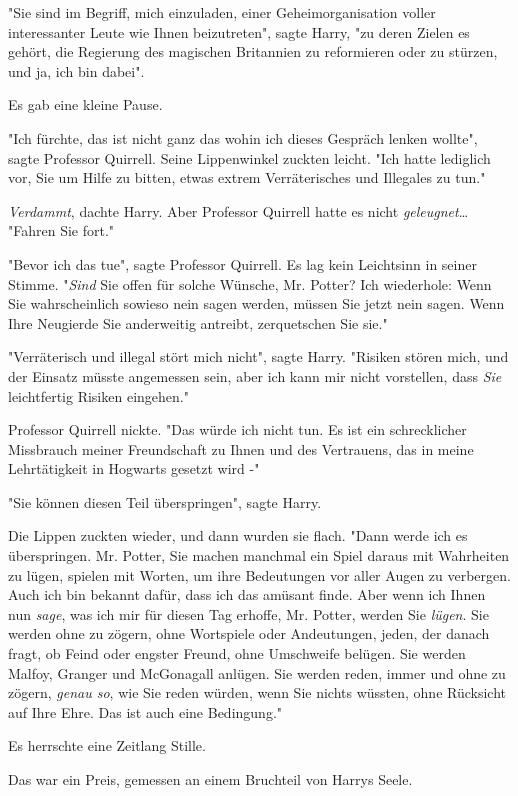 {"Sie sind im Begriff, mich einzuladen, einer Geheimorganisation voller interessanter Leute wie Ihnen beizutreten", sagte Harry, "zu deren Zielen es gehört, die Regierung des magischen Britannien zu reformieren oder zu stürzen, und ja, ich bin dabei".

Es gab eine kleine Pause.

"Ich fürchte, das ist nicht ganz das wohin ich dieses Gespräch lenken wollte", sagte Professor Quirrell. Seine Lippenwinkel zuckten leicht. "Ich hatte lediglich vor, Sie um Hilfe zu bitten, etwas extrem Verräterisches und Illegales zu tun."

\emph{Verdammt}, dachte Harry. Aber Professor Quirrell hatte es nicht \emph{geleugnet}… "Fahren Sie fort."

"Bevor ich das tue", sagte Professor Quirrell. Es lag kein Leichtsinn in seiner Stimme. "\emph{Sind} Sie offen für solche Wünsche, Mr. Potter? Ich wiederhole: Wenn Sie wahrscheinlich sowieso nein sagen werden, müssen Sie jetzt nein sagen. Wenn Ihre Neugierde Sie anderweitig antreibt, zerquetschen Sie sie."

"Verräterisch und illegal stört mich nicht", sagte Harry. "Risiken stören mich, und der Einsatz müsste angemessen sein, aber ich kann mir nicht vorstellen, dass \emph{Sie} leichtfertig Risiken eingehen."

Professor Quirrell nickte. "Das würde ich nicht tun. Es ist ein schrecklicher Missbrauch meiner Freundschaft zu Ihnen und des Vertrauens, das in meine Lehrtätigkeit in Hogwarts gesetzt wird -"

"Sie können diesen Teil überspringen", sagte Harry.

Die Lippen zuckten wieder, und dann wurden sie flach. "Dann werde ich es überspringen. Mr. Potter, Sie machen manchmal ein Spiel daraus mit Wahrheiten zu lügen, spielen mit Worten, um ihre Bedeutungen vor aller Augen zu verbergen. Auch ich bin bekannt dafür, dass ich das amüsant finde. Aber wenn ich Ihnen nun \emph{sage}, was ich mir für diesen Tag erhoffe, Mr. Potter, werden Sie \emph{lügen}. Sie werden ohne zu zögern, ohne Wortspiele oder Andeutungen, jeden, der danach fragt, ob Feind oder engster Freund, ohne Umschweife belügen. Sie werden Malfoy, Granger und McGonagall anlügen. Sie werden reden, immer und ohne zu zögern, \emph{genau so}, wie Sie reden würden, wenn Sie nichts wüssten, ohne Rücksicht auf Ihre Ehre. Das ist auch eine Bedingung."

Es herrschte eine Zeitlang Stille.

Das war ein Preis, gemessen an einem Bruchteil von Harrys Seele.

}
